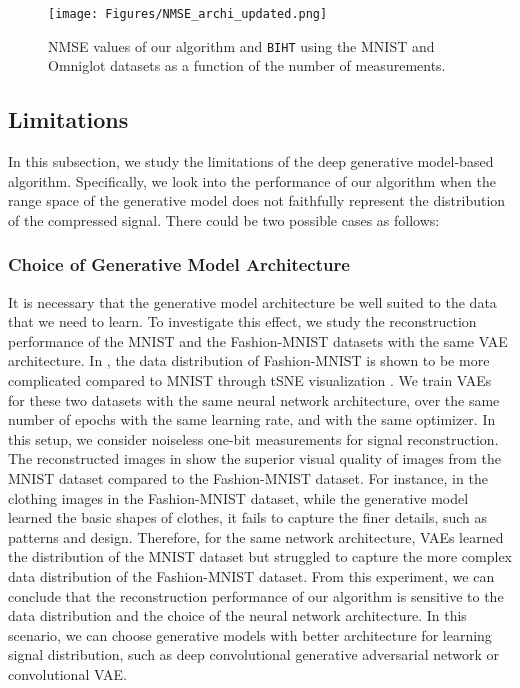 \documentclass[journal]{IEEEtran}
\begin{document}
\begin{figure}
\centering
\texttt{[image: Figures/NMSE\_archi\_updated.png]}
\caption{NMSE values of our algorithm and \texttt{BIHT} using the MNIST and Omniglot datasets as a function of the number of measurements.}
\label{fig:omniglot}
\end{figure}

\subsection{Limitations}
In this subsection, we study the limitations of the deep generative model-based algorithm. Specifically, we look into the performance of our algorithm when the range space of the generative model does not faithfully represent the distribution of the compressed signal. There could be two possible cases as follows:
\subsubsection{Choice of Generative Model Architecture} It is necessary that the generative model architecture be well suited to the data that we need to learn. To investigate this effect, we study the reconstruction performance of the MNIST and the Fashion-MNIST datasets with the same VAE architecture. In \cite{fashionMnist}, the data distribution of Fashion-MNIST is shown to be more complicated compared to MNIST through tSNE visualization \cite{maaten2008visualizing}. We train VAEs for these two datasets with the same neural network architecture, over the same number of epochs with the same learning rate, and with the same optimizer. In this setup, we consider noiseless one-bit measurements for signal reconstruction. The reconstructed images in   show the superior visual quality of images from the MNIST dataset compared to the Fashion-MNIST dataset. For instance, in the clothing images in the Fashion-MNIST dataset, while the generative model learned the basic shapes of clothes, it fails to capture the finer details, such as patterns and design. Therefore, for the same network architecture, VAEs learned the distribution of the MNIST dataset but struggled to capture the more complex data distribution of the Fashion-MNIST dataset. 
From this experiment, we can conclude that the reconstruction performance of our algorithm is sensitive to the data distribution and the choice of the neural network architecture. In this scenario, we can choose generative models with better architecture for learning signal distribution, such as deep convolutional generative adversarial network or convolutional VAE.
\end{document}
